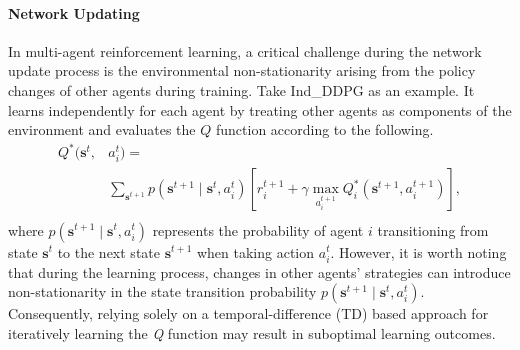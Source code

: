 \documentclass[lettersize,journal]{IEEEtran}
\begin{document}
\paragraph{\textbf{Network Updating}}
In multi-agent reinforcement learning, a critical challenge during the network update process is the environmental non-stationarity arising from the policy changes of other agents during training.  Take  Ind\_DDPG \cite{lillicrap2015continuous} as an example. It learns independently for each agent by treating other agents as components of the environment and evaluates the $Q$ function according to the following.
\begin{equation*} 
    \begin{aligned}
        Q^*(\pmb s^t,& a_i^t)= \\
        &\sum_{\pmb s^{t+1}}p(\pmb s^{t+1} \mid \pmb s^t,a_i^t)[r_i^{t+1}+\gamma\max_{a_i^{t+1}}Q_i^*(\pmb s^{t+1},a_i^{t+1})],\\
    \end{aligned} 
\end{equation*}
where $p(\pmb s^{t+1}\mid \pmb s^t,a_i^t)$ represents the probability of agent $i$ transitioning from state $\pmb s^t$ to the next state $\pmb s^{t+1}$ when taking action $a_i^t$. However, it is worth noting  that during the learning process, changes in other agents' strategies can introduce non-stationarity in the state transition probability $p(\pmb s^{t+1}\mid \pmb s^t,a_i^t)$. Consequently, relying solely on a temporal-difference (TD) based approach for iteratively learning the \textit{Q} function may result in suboptimal learning outcomes.
\end{document}
